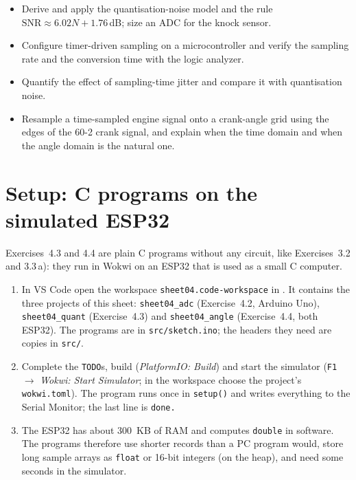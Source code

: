 
\begin{goals}
\begin{itemize}
  \item Derive and apply the quantisation-noise model and the rule
    $\mathrm{SNR}\approx 6.02N+1.76$\,dB; size an ADC for the knock sensor.
  \item Configure timer-driven sampling on a microcontroller and verify the
    sampling rate and the conversion time with the logic analyzer.
  \item Quantify the effect of sampling-time jitter and compare it with
    quantisation noise.
  \item Resample a time-sampled engine signal onto a crank-angle grid using
    the edges of the 60-2 crank signal, and explain when the time domain and
    when the angle domain is the natural one.
\end{itemize}
\end{goals}

\section*{Setup: C programs on the simulated ESP32}
Exercises~4.3 and 4.4 are plain C programs without any circuit, like
Exercises~3.2 and 3.3\,a): they run in Wokwi on an ESP32 that is used as a
small C computer.
\begingroup\sloppy
\begin{enumerate}
  \item In VS Code open the workspace \texttt{sheet04.code-workspace} in
    . It contains the three projects of this sheet:
    \texttt{sheet04\_adc} (Exercise~4.2, Arduino Uno), \texttt{sheet04\_quant}
    (Exercise~4.3) and \texttt{sheet04\_angle} (Exercise~4.4, both ESP32).
    The programs are in \texttt{src/sketch.ino}; the headers they need are
    copies in \texttt{src/}.
  \item Complete the \texttt{TODO}s, build (\emph{PlatformIO: Build}) and start
    the simulator (\texttt{F1} $\to$ \emph{Wokwi: Start Simulator}; in the
    workspace choose the project's \texttt{wokwi.toml}). The program runs once
    in \texttt{setup()} and writes everything to the Serial Monitor; the last
    line is \texttt{done.}
  \item The ESP32 has about \SI{300}{KB} of RAM and computes \texttt{double}
    in software. The programs therefore use shorter records than a PC
    program would, store long sample arrays as \texttt{float} or 16-bit
    integers (on the heap), and need some seconds in the simulator.
\end{enumerate}
\endgroup

